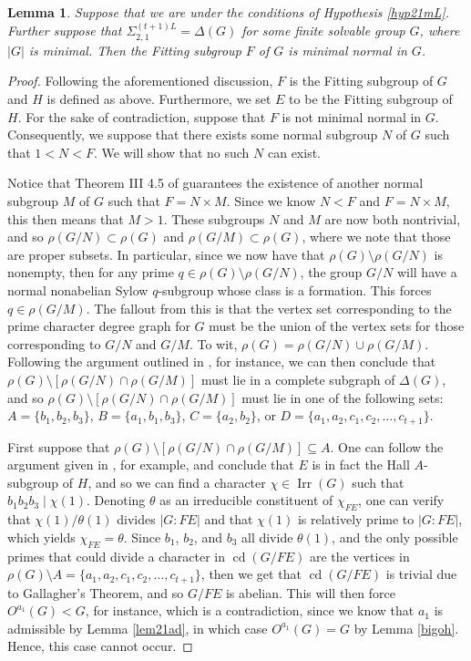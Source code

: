 \documentclass[11pt]{amsart}
\newtheorem{lemma}[theorem]{Lemma}
\theoremstyle{definition}
\theoremstyle{remark}
\DeclareMathOperator{\cd}{cd}
\DeclareMathOperator{\Irr}{Irr}
\numberwithin{equation}{section}
\newcommand{\SLi}[3]{\Sigma_{#1,#2}^{#3L}} %
\begin{document}
\begin{lemma}\label{lem21mLfit}
Suppose that we are under the conditions of Hypothesis \ref{hyp21mL}. Further suppose that $\SLi{2}{1}{(t+1)}=\Delta(G)$ for some finite solvable group $G$, where $|G|$ is minimal. Then the Fitting subgroup $\textit{F}$ of $G$ is minimal normal in $G$.
\end{lemma}
\begin{proof}
Following the aforementioned discussion, $F$ is the Fitting subgroup of $G$ and $H$ is defined as above. Furthermore, we set $E$ to be the Fitting subgroup of $H$. For the sake of contradiction, suppose that $F$ is not minimal normal in $G$. Consequently, we suppose that there exists some normal subgroup $N$ of $G$ such that $1<N<F$. We will show that no such $N$ can exist.

Notice that Theorem III 4.5 of \cite{H} guarantees the existence of another normal subgroup $M$ of $G$ such that $F=N\times M$. Since we know $N<F$ and $F=N\times M$, this then means that $M>1$. These subgroups $N$ and $M$ are now both nontrivial, and so $\rho(G/N)\subset\rho(G)$ and $\rho(G/M)\subset\rho(G)$, where we note that those are proper subsets. In particular, since we now have that $\rho(G)\setminus\rho(G/N)$ is nonempty, then for any prime $q\in\rho(G)\setminus\rho(G/N)$, the group $G/N$ will have a normal nonabelian Sylow $q$-subgroup whose class is a formation. This forces $q\in\rho(G/M)$. The fallout from this is that the vertex set corresponding to the prime character degree graph for $G$ must be the union of the vertex sets for those corresponding to $G/N$ and $G/M$. To wit, $\rho(G)=\rho(G/N)\cup\rho(G/M)$. Following the argument outlined in \cite{LMS}, for instance, we can then conclude that $\rho(G)\setminus[\rho(G/N)\cap\rho(G/M)]$ must lie in a complete subgraph of $\Delta(G)$, and so $\rho(G)\setminus[\rho(G/N)\cap\rho(G/M)]$ must lie in one of the following sets: $A=\{b_1,b_2,b_3\}$, $B=\{a_1,b_1,b_3\}$, $C=\{a_2,b_2\}$, or $D=\{a_1,a_2,c_1,c_2,\ldots,c_{t+1}\}$.

First suppose that $\rho(G)\setminus[\rho(G/N)\cap\rho(G/M)]\subseteq A$. One can follow the argument given in \cite{L3}, for example, and conclude that $E$ is in fact the Hall $A$-subgroup of $H$, and so we can find a character $\chi\in\Irr(G)$ such that $b_1b_2b_3\mid\chi(1)$. Denoting $\theta$ as an irreducible constituent of $\chi_{FE}$, one can verify that $\chi(1)/\theta(1)$ divides $|G:FE|$ and that $\chi(1)$ is relatively prime to $|G:FE|$, which yields $\chi_{FE}=\theta$. Since $b_1$, $b_2$, and $b_3$ all divide $\theta(1)$, and the only possible primes that could divide a character in $\cd(G/FE)$ are the vertices in $\rho(G)\setminus A=\{a_1,a_2,c_1,c_2,\ldots,c_{t+1}\}$, then we get that $\cd(G/FE)$ is trivial due to Gallagher's Theorem, and so $G/FE$ is abelian. This will then force $O^{a_1}(G)<G$, for instance, which is a contradiction, since we know that $a_1$ is admissible by Lemma \ref{lem21ad}, in which case $O^{a_1}(G)=G$ by Lemma \ref{bigoh}. Hence, this case cannot occur.


\end{proof}
\end{document}
